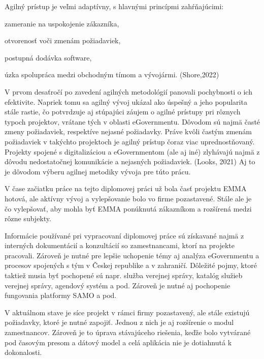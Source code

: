 Agilný prístup je veľmi adaptívny, s hlavnými princípmi zahŕňajúcimi:

\startitemize
\item zameranie na uspokojenie zákazníka, 
\item otvorenosť voči zmenám požiadaviek,
\item postupná dodávka software,
\item úzka spolupráca medzi obchodným tímom a vývojármi. \scr(Shore,2022) 
\stopitemize

V prvom desaťročí po zavedení agilných metodológií panovali pochybnosti o ich efektivite. Napriek tomu sa agilný vývoj ukázal ako úspešný a jeho popularita stále rastie, čo potvrdzuje aj stúpajúci záujem o agilné prístupy pri rôznych typoch projektov, vrátane tých v oblasti eGovernmentu. Dôvodom sú najmä časté zmeny požiadaviek, respektíve nejasné požiadavky. Práve kvôli častým zmenám požiadaviek v takýchto projektoch je agilný prístup čoraz viac uprednostňovaný. Projekty spojené s digitalizáciou a eGovernmentom (ale aj iné) zlyhávajú najmä z dôvodu nedostatočnej komunikácie a nejasných požiadaviek. \scr(Looks, 2021) Aj to je dôvodom výberu agilnej metodiky vývoja pre túto prácu.


V čase začiatku práce na tejto diplomovej práci už bola časť projektu EMMA hotová, ale aktívny vývoj a vylepšovanie bolo vo firme pozastavené. Stále ale je čo vylepšovať, aby mohla byť EMMA ponúknutá zákazníkom a rozšírená medzi rôzne subjekty.

Informácie používané pri vypracovaní diplomovej práce sú získavané najmä z interných dokumentácií a konzultácií so zamestnancami, ktorí na projekte pracovali. Zároveň je nutné pre lepšie uchopenie témy aj analýza eGovernmentu a procesov spojených s tým v Českej republike a v zahraničí. Dôležité pojmy, ktoré taktiež musia byť pochopené sú napr. služba verejnej správy, katalóg služieb verejnej správy, agendový systém a pod. Zároveň je nutné aj pochopenie fungovania platformy SAMO a pod.

V aktuálnom stave je síce projekt v rámci firmy pozastavený, ale stále existujú požiadavky, ktoré je nutné zapojiť. Jednou z nich je aj rozšírenie o modul zamestnancov. Zároveň je to úprava stávajúceho riešenia, keďže bolo vytvárané pod časovým presom a dátový model a celá aplikácia nie je dotiahnutá k dokonalosti. 

